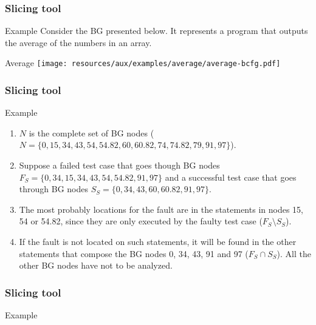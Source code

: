 \begin{frame}
\frametitle{Slicing tool}

\begin{block}{Example}
Consider the BG presented below. It represents a program that outputs the
average of the numbers in an array.
\end{block}

\begin{block}{Average}
\centering
\texttt{[image: resources/aux/examples/average/average-bcfg.pdf]}
\end{block}
\end{frame}


\begin{frame}
\frametitle{Slicing tool}

\begin{block}{Example}
\begin{enumerate}
	\item $N$ is the complete set of BG nodes ($N = \{0, 15, 34, 43, 54,
	54.82, 60, 60.82, 74, 74.82, 79, 91, 97\}$).

	\item Suppose a failed test case that goes though BG nodes
	$F_S = \{0, 34, 15, 34, 43, 54, 54.82, 91, 97\}$ and a successful
	test case that goes through BG nodes $S_S = \{0, 34, 43, 60,
	60.82, 91, 97\}$.

	\item The most probably locations for the fault are in
	the statements in nodes 15, 54 or 54.82, since they are only
	executed by the faulty test case ($F_S \setminus S_S$).

	\item If the fault is not located on such statements, it will be found in
	the other statements that compose the BG nodes 0, 34, 43, 91 and 97
	($F_S \cap S_S$). All the other BG nodes have not to be analyzed.
\end{enumerate}
\end{block}
\end{frame}



\begin{frame}[hasnext=false]
\frametitle{Slicing tool}

\begin{block}{Example}
\end{block}
\end{frame}
